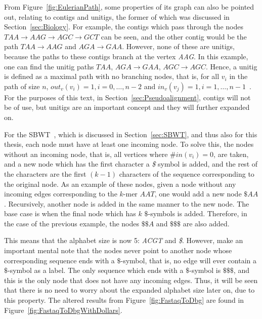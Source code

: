 From Figure~\ref{fig:EulerianPath}, some properties of its graph can also be pointed out, relating to contigs and unitigs, the former of which was discussed in Section~\ref{sec:Biology}.
For example, the contigs which pass through the nodes $\mathit{TAA} \rightarrow \mathit{AAG} \rightarrow \mathit{AGC} \rightarrow \mathit{GCT}$ can be seen, and the other contig would be the path $\mathit{TAA} \rightarrow \mathit{AAG}$ and $\mathit{AGA} \rightarrow \mathit{GAA}$.
However, none of these are unitigs, because the paths to these contigs branch at the vertex \textit{AAG}.
In this example, one can find the unitig paths $\mathit{TAA}$, $\mathit{AGA} \rightarrow \mathit{GAA}$, $\mathit{AGC} \rightarrow \mathit{AGC}$.
Hence, a unitig is defined as a maximal path with no branching nodes, that is, for all $v_i$ in the path of size $n$, $out_v(v_i) = 1, i = 0,\ldots,n - 2$ and $in_v(v_j) = 1, i = 1,\ldots,n - 1$~\cite{Themisto}.
For the purposes of this text, in Section~\ref{sec:Pseudoalignment}, contigs will not be of use, but unitigs are an important concept and they will further expanded on.

For the SBWT~\cite{SBWT}, which is discussed in Section~\ref{sec:SBWT}, and thus also for this thesis, each node must have at least one incoming node.
To solve this, the nodes without an incoming node, that is, all vertices where $\#in(v_i) = 0$, are taken, and a new node which has the first character a \textit{\$} symbol is added, and the rest of the characters are the first $(k-1)$ characters of the sequence corresponding to the original node.
As an example of these nodes, given a node without any incoming edges corresponding to the $k$-mer $AAT$, one would add a new node $\$AA$.
Recursively, another node is added in the same manner to the new node.
The base case is when the final node which has $k$ $\$$-symbols is added.
Therefore, in the case of the previous example, the nodes $\$\$A$ and $\$\$\$$ are also added.

This means that the alphabet size is now 5: \textit{ACGT} and \textit{\$}.
However, make an important mental note that the nodes never point to another node whose corresponding sequence ends with a $\$$-symbol, that is, no edge will ever contain a $\$$-symbol as a label.
The only sequence which ends with a $\$$-symbol is $\$\$\$$, and this is the only node that does not have any incoming edges.
Thus, it will be seen that there is no need to worry about the expanded alphabet size later on, due to this property.
The altered results from Figure~\ref{fig:FastaqToDbg} are found in Figure~\ref{fig:FastaqToDbgWithDollars}.


